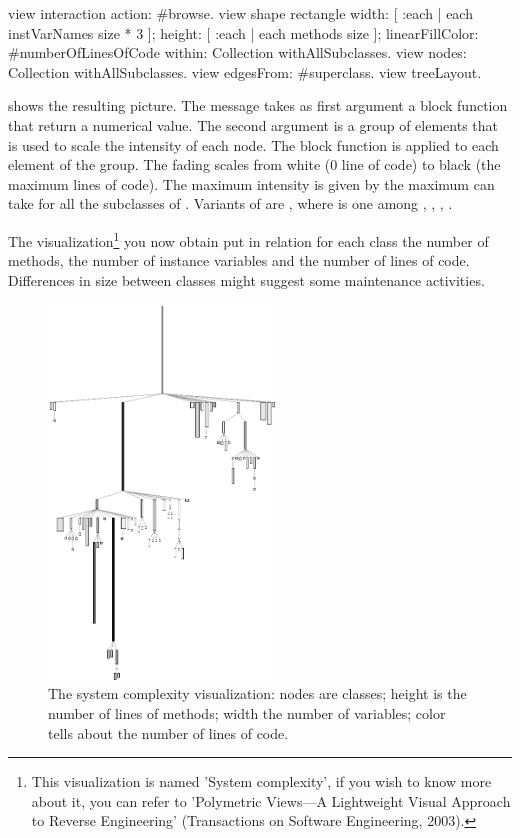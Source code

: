 \documentclass[a4paper,10pt,twoside]{book}
\begin{document}
\begin{code}{}
view interaction action: #browse.
view shape rectangle
	width: [ :each | each instVarNames size * 3 ];
	height: [ :each | each methods size ];
	linearFillColor: #numberOfLinesOfCode within: Collection withAllSubclasses.
view nodes: Collection withAllSubclasses.
view edgesFrom: #superclass.
view treeLayout.
\end{code}

 shows the resulting picture. The message  takes as first argument a block function that return a numerical value. The second argument is a group of elements that is used to scale the intensity of each node. The block function is applied to each element of the group. The fading scales from white (0 line of code) to black (the maximum lines of code). The maximum intensity is given by the maximum  can take for all the subclasses of . 
Variants of  are , where  is one among , , , .

The visualization\footnote{This visualization is named 'System complexity', if you wish to know more about it, you can refer to 'Polymetric Views---A Lightweight Visual Approach to Reverse Engineering' (Transactions on Software Engineering, 2003).} you now obtain put in relation for each class the number of methods, the number of instance variables and the number of lines of code. Differences in size between classes might suggest some maintenance activities. 



\begin{figure}[htbp]
\centerline{\includegraphics[width=6cm]{systemComplexity}}
\caption{The system complexity visualization: nodes are classes; height is the number of lines of methods; width the number of variables; color tells about the number of lines of code.}
\label{fig:systemComplexity}
\end{figure}
\end{document}
